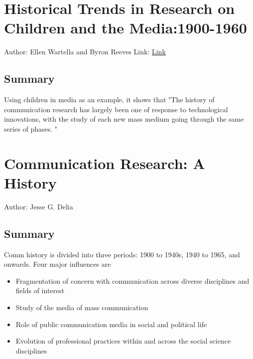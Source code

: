 \section{Historical Trends in Research on Children and the Media:1900-1960}
Author: Ellen Wartella and Byron Reeves 
Link: \href{https://academic.oup.com/joc/article-abstract/35/2/118/4282851?redirectedFrom=fulltext}{Link}

\subsection{Summary}
Using children in media as an example, it shows that "The history of communication research has largely been one of response to technological innovations, with the study of each new mass medium going through the same series of phases. "





\section{Communication Research: A History} 
Author: Jesse G. Delia 

\subsection{Summary} 
Comm history is divided into three periods: 1900 to 1940s, 1940 to 1965, and onwards. Four major influences are 
    \begin{itemize}
        \item Fragmentation of concern with communication across diverse disciplines and fields of interest  
        \item Study of the media of mass communication 
        \item Role of public communication media in social and political life 
        \item Evolution of professional practices within and across the social science disciplines
    \end{itemize}

